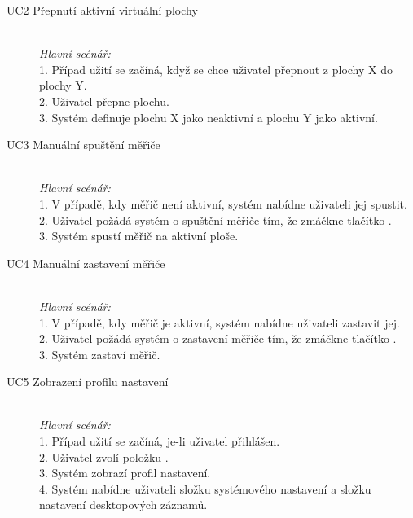 \documentclass[thesis=B,czech]{FITthesis}[2012/06/26]
\begin{document}
\begin{description}
	
	\item[UC2 Přepnutí aktivní virtuální plochy] \hspace*{\fill} \\
	\textit{Hlavní scénář:}
	\\
	1. Případ užití se začíná, když se chce uživatel přepnout z plochy X do plochy Y.  \\
	2. Uživatel přepne plochu.
	\\
	3. Systém definuje plochu X jako neaktivní a plochu Y jako aktivní. 
	\\
	\newpage
	\item[UC3 Manuální spuštění měřiče] \hspace*{\fill} \\
	\textit{Hlavní scénář:}
	\\
	1. V případě, kdy měřič není aktivní, systém nabídne uživateli jej spustit. \\
	2. Uživatel požádá systém o spuštění měřiče tím, že zmáčkne tlačítko . \\
	3. Systém spustí měřič na aktivní ploše.\\
	
	
	\item[UC4 Manuální zastavení měřiče] \hspace*{\fill} \\
	\textit{Hlavní scénář:}
	\\
	1. V případě, kdy měřič je aktivní, systém nabídne uživateli zastavit jej. \\
	2. Uživatel požádá systém o zastavení měřiče tím, že zmáčkne tlačítko . \\
	3. Systém zastaví měřič.			
	
	\item[UC5 Zobrazení profilu nastavení] \hspace*{\fill} \\
	\textit{Hlavní scénář:}
	\\
	1. Případ užití se začíná, je-li uživatel přihlášen. \\
	2. Uživatel zvolí položku . \\
	3. Systém zobrazí profil nastavení. \\
	4. Systém nabídne uživateli složku systémového nastavení a složku nastavení desktopových záznamů.  
	

\end{description}
\end{document}
